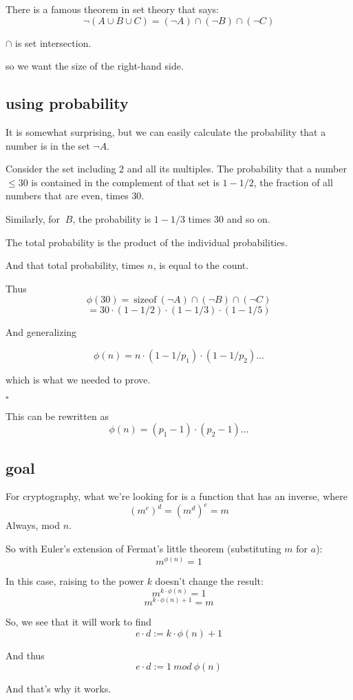 \documentclass[11pt, oneside]{article}
\begin{document}
There is a famous theorem in set theory that says: 
\[ \neg(A \cup B \cup C) = (\neg A) \cap (\neg B)  \cap (\neg C) \]

$ \cap$ is set intersection.

so we want the size of the right-hand side.

\subsection*{using probability}

It is somewhat surprising, but we can easily calculate the probability that a number is in the set $\neg A$.  

Consider the set including $2$ and all its multiples.  The probability that a number $\le 30$ is contained in the complement of that set is $1 - 1/2$, the fraction of all numbers that are even, times $30$.  

Similarly, for $~B$, the probability is $1 - 1/3$ times $30$ and so on.

The total probability is the product of the individual probabilities.

And that total probability, times $n$, is equal to the count.

Thus
\[ \phi(30) = \ \text{sizeof} \  (\neg A) \cap (\neg B)  \cap (\neg C) \]
\[  = 30 \cdot (1 - 1/2) \cdot (1 - 1/3) \cdot (1 - 1/5) \]
    
And generalizing

\[ \phi(n) = n \cdot (1 - 1/p_1) \cdot (1 - 1/p_2) \dots \]
    
which is what we needed to prove.

$\square$

This can be rewritten as
\[ \phi(n) = (p_1 - 1) \cdot (p_2 - 1) \dots \]

\subsection*{goal}

For cryptography, what we're looking for is a function that has an inverse, where
\[ (m^e)^d = (m^d)^e = m \]
Always, mod $n$.

So with Euler's extension of Fermat's little theorem (substituting $m$ for $a$):
\[ m^{\phi(n)} = 1 \]
    
In this case, raising to the power $k$ doesn't change the result:
\[ m^{k \cdot \phi(n)} = 1\]
\[ m^{k \cdot \phi(n) + 1} = m \]

So, we see that it will work to find
\[ e \cdot d := k \cdot \phi(n) + 1 \]

And thus
\[ e \cdot d := 1 \ mod \ \phi(n) \]

And that's why it works.
\end{document}
